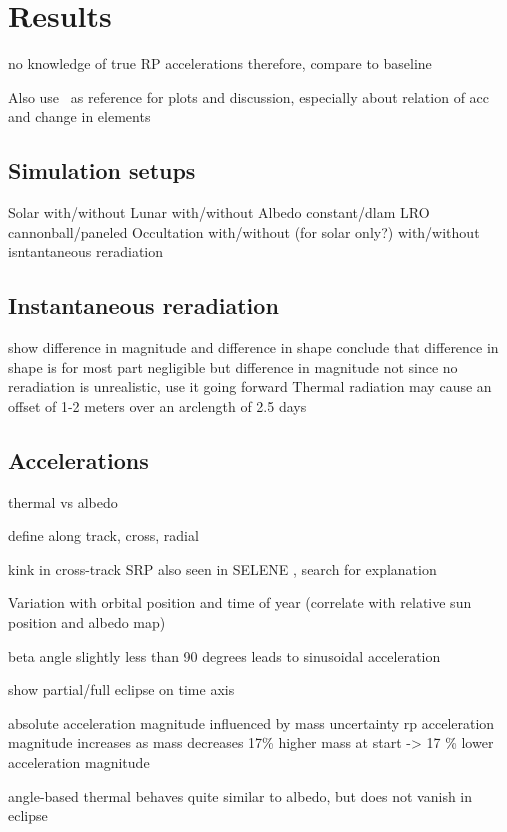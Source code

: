 \section{Results}

no knowledge of true RP accelerations
therefore, compare to baseline

Also use~\cite{Borderies1990} as reference for plots and discussion, especially about relation of acc and change in elements

\subsection{Simulation setups}

Solar with/without
Lunar with/without
Albedo constant/dlam
LRO cannonball/paneled
Occultation with/without (for solar only?)
with/without isntantaneous reradiation

\subsection{Instantaneous reradiation}
show difference in magnitude and difference in shape
conclude that difference in shape is for most part negligible but difference in magnitude not
since no reradiation is unrealistic, use it going forward
Thermal radiation may cause an offset of 1-2 meters over an arclength of 2.5 days~\cite{Bauer2016}


\subsection{Accelerations}
thermal vs albedo

define along track, cross, radial

kink in cross-track SRP also seen in SELENE \cite{Kubooka1999}, search for explanation

Variation with orbital position and time of year (correlate with relative sun position and albedo map)

beta angle slightly less than 90 degrees leads to sinusoidal acceleration

show partial/full eclipse on time axis

absolute acceleration magnitude influenced by mass uncertainty
rp acceleration magnitude increases as mass decreases
17\% higher mass at start -> 17 \% lower acceleration magnitude

angle-based thermal behaves quite similar to albedo, but does not vanish in eclipse

